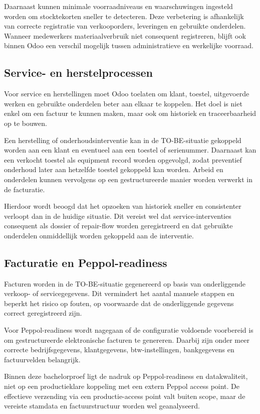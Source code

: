 Daarnaast kunnen minimale voorraadniveaus en waarschuwingen ingesteld worden om stocktekorten sneller te detecteren. Deze verbetering is afhankelijk van correcte registratie van verkooporders, leveringen en gebruikte onderdelen. Wanneer medewerkers materiaalverbruik niet consequent registreren, blijft ook binnen Odoo een verschil mogelijk tussen administratieve en werkelijke voorraad.

\subsection{Service- en herstelprocessen}

Voor service en herstellingen moet Odoo toelaten om klant, toestel, uitgevoerde werken en gebruikte onderdelen beter aan elkaar te koppelen. Het doel is niet enkel om een factuur te kunnen maken, maar ook om historiek en traceerbaarheid op te bouwen.

Een herstelling of onderhoudsinterventie kan in de TO-BE-situatie gekoppeld worden aan een klant en eventueel aan een toestel of serienummer. Daarnaast kan een verkocht toestel als equipment record worden opgevolgd, zodat preventief onderhoud later aan hetzelfde toestel gekoppeld kan worden. Arbeid en onderdelen kunnen vervolgens op een gestructureerde manier worden verwerkt in de facturatie.

Hierdoor wordt beoogd dat het opzoeken van historiek sneller en consistenter verloopt dan in de huidige situatie. Dit vereist wel dat service-interventies consequent als dossier of repair-flow worden geregistreerd en dat gebruikte onderdelen onmiddellijk worden gekoppeld aan de interventie.

\subsection{Facturatie en Peppol-readiness}

Facturen worden in de TO-BE-situatie gegenereerd op basis van onderliggende verkoop- of servicegegevens. Dit vermindert het aantal manuele stappen en beperkt het risico op fouten, op voorwaarde dat de onderliggende gegevens correct geregistreerd zijn.

Voor Peppol-readiness wordt nagegaan of de configuratie voldoende voorbereid is om gestructureerde elektronische facturen te genereren. Daarbij zijn onder meer correcte bedrijfsgegevens, klantgegevens, btw-instellingen, bankgegevens en factuurvelden belangrijk.

Binnen deze bachelorproef ligt de nadruk op Peppol-readiness en datakwaliteit, niet op een productieklare koppeling met een extern Peppol access point. De effectieve verzending via een productie-access point valt buiten scope, maar de vereiste stamdata en factuurstructuur worden wel geanalyseerd.


